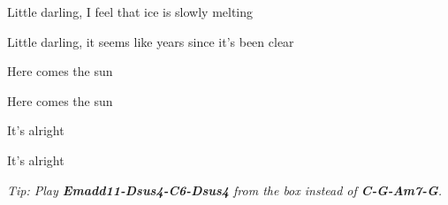 \begin{song}
\bigskip

 Little darling, I feel that ice is slowly melting \par
{} Little darling, it seems like years since it's been clear \par

\bigskip

\Chorus

\bigskip

\begin{strumbox}
\normalsize
{}
\end{strumbox}

 Here comes the sun  \par
{} Here comes the sun \par
{} It's alright   \par
{} It's alright   \par

   

\vfill

{
\smaller\it Tip: Play \textbf{Emadd11-Dsus4-C6-Dsus4} from the box instead of \textbf{C-G-Am7-G}.
}

\medskip


\end{song}
